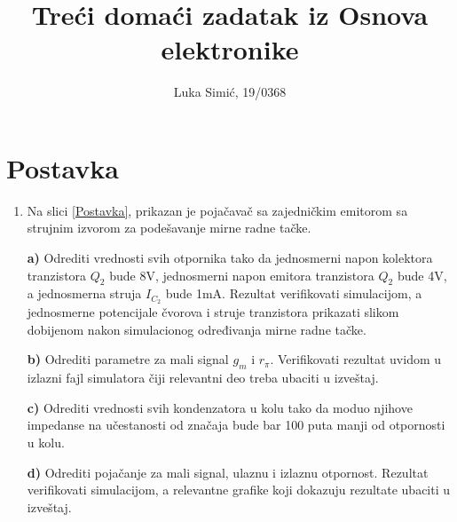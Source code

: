 \documentclass{article}
\title{Treći domaći zadatak iz Osnova elektronike}
\author{Luka Simić, 19/0368}
\date{}
\begin{document}
    \begin{titlepage}
        \maketitle
    \end{titlepage}

    \section{Postavka}
        \begin{enumerate}[itemsep=\baselineskip]
            \item Na slici \ref{Postavka}, prikazan je pojačavač sa zajedničkim emitorom sa strujnim izvorom za podešavanje mirne radne tačke.
    
            \textbf{a)} Odrediti vrednosti svih otpornika tako da jednosmerni napon kolektora tranzistora $Q_2$ bude 8V, jednosmerni napon emitora tranzistora $Q_2$ bude 4V, a jednosmerna struja $I_{C_2}$ bude 1mA. Rezultat verifikovati simulacijom, a jednosmerne potencijale čvorova i struje tranzistora prikazati slikom dobijenom nakon simulacionog određivanja mirne radne tačke.
    
            \textbf{b)} Odrediti parametre za mali signal $g_m$ i $r_\pi$. Verifikovati rezultat uvidom u izlazni fajl simulatora čiji relevantni deo treba ubaciti u izveštaj.
    
            \textbf{c)} Odrediti vrednosti svih kondenzatora u kolu tako da moduo njihove impedanse na učestanosti od značaja bude bar 100 puta manji od otpornosti u kolu.
    
            \textbf{d)} Odrediti pojačanje za mali signal, ulaznu i izlaznu otpornost. Rezultat verifikovati simulacijom, a relevantne grafike koji dokazuju rezultate ubaciti u izveštaj.
        \end{enumerate}
\end{document}
